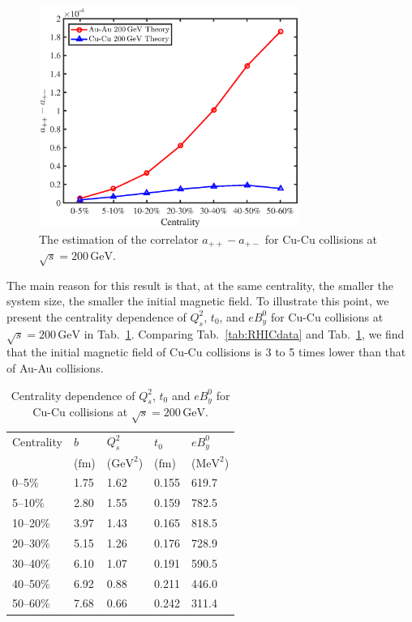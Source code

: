 \documentclass[preprint]{elsarticle}
\begin{document}
\begin{figure}
\centering
\includegraphics[width=8.5cm]{fig5.eps}
\caption{\label{fig5}The estimation of the correlator $a_{++} - a_{+-}$ for Cu-Cu collisions at $\sqrt{s} = 200\,\mathrm{GeV}$.}
\end{figure}

The main reason for this result is that, at the same centrality, the smaller the system size, the smaller the initial magnetic field. To illustrate this point, we present the centrality dependence of $Q_s^2$, $t_0$, and $eB_y^0$ for Cu-Cu collisions at $\sqrt{s} = 200\,\mathrm{GeV}$ in Tab.~\ref{tab:CuRHICdata}. Comparing Tab.~\ref{tab:RHICdata} and Tab.~\ref{tab:CuRHICdata}, we find that the initial magnetic field of Cu-Cu collisions is 3 to 5 times lower than that of Au-Au collisions.


\begin{table}
\centering
\caption{\label{tab:CuRHICdata}Centrality dependence  of $Q_s^2$, $t_0$ and $eB_y^0$ for Cu-Cu collisions at $\sqrt{s} = 200\,\mathrm{GeV}$.}
\begin{tabular}{lllll}
\hline
  Centrality & $b$ & $Q_s^2$ & $t_0$ & $eB_y^0$ \\
             & ($\mathrm{fm}$)  &  ($\mathrm{GeV}^2$) & ($\mathrm{fm}$) & ($\mathrm{MeV}^2$) \\
\hline
0--5\% & 1.75 & 1.62 & 0.155 & 619.7 \\
5--10\% & 2.80 & 1.55 & 0.159 & 782.5 \\
10--20\% & 3.97 & 1.43 & 0.165 & 818.5 \\
20--30\% & 5.15 & 1.26 & 0.176 & 728.9 \\
30--40\% & 6.10 & 1.07 & 0.191 & 590.5 \\
40--50\% & 6.92 & 0.88 & 0.211 & 446.0 \\
50--60\% & 7.68 & 0.66 & 0.242 & 311.4 \\
  \hline
\end{tabular}
\end{table}
\end{document}
